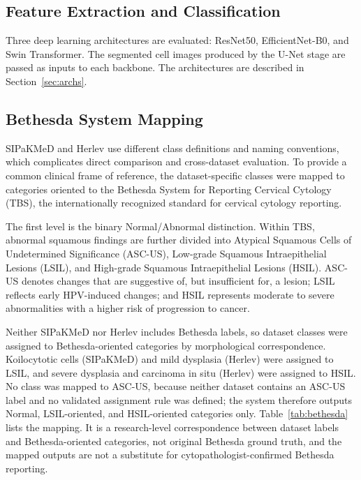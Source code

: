 \documentclass[conference]{IEEEtran}
\begin{document}
\subsection{Feature Extraction and Classification}

Three deep learning architectures are evaluated: ResNet50, EfficientNet-B0, and Swin Transformer. The segmented cell images produced by the U-Net stage are passed as inputs to each backbone. The architectures are described in Section~\ref{sec:archs}.

\subsection{Bethesda System Mapping}
\label{sec:bethesda}

SIPaKMeD and Herlev use different class definitions and naming conventions, which complicates direct comparison and cross-dataset evaluation. To provide a common clinical frame of reference, the dataset-specific classes were mapped to categories oriented to the Bethesda System for Reporting Cervical Cytology (TBS), the internationally recognized standard for cervical cytology reporting.

The first level is the binary Normal/Abnormal distinction. Within TBS, abnormal squamous findings are further divided into Atypical Squamous Cells of Undetermined Significance (ASC-US), Low-grade Squamous Intraepithelial Lesions (LSIL), and High-grade Squamous Intraepithelial Lesions (HSIL). ASC-US denotes changes that are suggestive of, but insufficient for, a lesion; LSIL reflects early HPV-induced changes; and HSIL represents moderate to severe abnormalities with a higher risk of progression to cancer.

Neither SIPaKMeD nor Herlev includes Bethesda labels, so dataset classes were assigned to Bethesda-oriented categories by morphological correspondence. Koilocytotic cells (SIPaKMeD) and mild dysplasia (Herlev) were assigned to LSIL, and severe dysplasia and carcinoma in situ (Herlev) were assigned to HSIL. No class was mapped to ASC-US, because neither dataset contains an ASC-US label and no validated assignment rule was defined; the system therefore outputs Normal, LSIL-oriented, and HSIL-oriented categories only. Table~\ref{tab:bethesda} lists the mapping. It is a research-level correspondence between dataset labels and Bethesda-oriented categories, not original Bethesda ground truth, and the mapped outputs are not a substitute for cytopathologist-confirmed Bethesda reporting.
\end{document}
